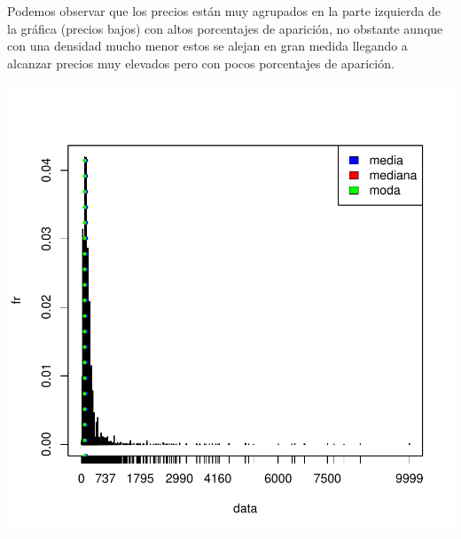 \documentclass [a4paper] {article}
\begin{document}
Podemos observar que los precios están muy agrupados en la parte izquierda de la gráfica (precios bajos) con altos porcentajes de aparición,
no obstante aunque con una densidad mucho menor estos se alejan en gran medida llegando a alcanzar precios muy elevados pero con pocos porcentajes de aparición.

\begin{center}
\includegraphics{entrega-estadisticos_BNB_plot}
\end{center}
\end{document}
